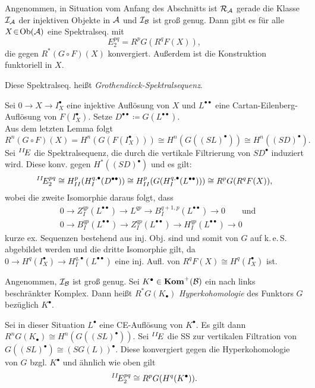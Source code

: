 \documentclass{cheat-sheet}
\newcommand{\CC}[1]{{#1}_{\bullet}} %
\newcommand{\CCC}[1]{{#1}^{\bullet}} %
\newcommand{\DC}[1]{{#1}^{\bullet \bullet}} %
\newcommand{\keS}{k.\,e.\,S.} %
\newcommand{\Inj}{\mathcal{I}} %
\newcommand{\Ada}{\mathcal{R}} %
\begin{document}

\begin{thm}
  Angenommen, in Situation vom Anfang des Abschnitts ist $\Ada_\Aat$ gerade die Klasse $\Inj_\Aat$ der injektiven Objekte in $\mathcal{A}$ und $\mathcal{I}_{\mathcal{B}}$ ist groß genug.
  Dann gibt es für alle $X \!\in\! \operatorname{Ob}(\mathcal{A})$ eine Spektralseq. mit
  \[ E^{pq}_2 = R^p G(R^q F(X)), \]
  die gegen $R^*(G \circ F)(X)$ konvergiert.
  Außerdem ist die Konstruktion funktoriell in $X$.
\end{thm}

\begin{defn}
  Diese Spektralseq. heißt \emph{Grothendieck-Spektralsequenz}.
\end{defn}

\begin{beweis}
  Sei $0 \to X \to \CCC{I}_X$ eine injektive Auflösung von $X$ und $\DC{L}$ eine Cartan-Eilenberg-Auflösung von $F(\CCC{I}_X)$.
  Setze $\DC{D} \coloneqq G(\DC{L})$. \\
  Aus dem letzten Lemma folgt
  \[ R^n (G \circ F)(X) = H^n(G(F(\CCC{I}_X))) \cong H^n(G(\CCC{(SL)})) \cong H^n(\CCC{(SD)}). \]
  Sei $\prescript{II}{}\!E$ die Spektralsequenz, die durch die vertikale Filtrierung von $\CCC{SD}$ induziert wird. Diese konv. gegen $H^*(\CCC{(SD)})$ und es gilt:
  \[ \prescript{II}{}\!E^{pq}_2 \cong H_{II}^{p}(H_I^{q,\bullet}(\DC{D})) \cong H_{II}^p(G(H_I^{q,\bullet}(\DC{L}))) \cong R^p G(R^q F(X)), \]
  wobei die zweite Isomorphie daraus folgt, dass
  \begin{align*}
    & 0 \to Z^{qp}_I(\DC{L}) \to L^{qp} \to B^{q+1,p}_I(\DC{L}) \to 0
    \qquad \text{und} \\
    & 0 \to B^{qp}_I(\DC{L}) \to Z^{qp}_I(\DC{L}) \to H^{qp}_I(\DC{L}) \to 0
  \end{align*}
  kurze ex. Sequenzen bestehend aus inj. Obj. sind und somit von $G$ auf \keS{} abgebildet werden und die dritte Isomorphie gilt, da $0 \to H^q(\CCC{I}_X) \to H^{q,\bullet}_I(\DC{L})$ eine inj. Aufl. von $R^q F(X) \cong H^q(\CCC{I}_X)$ ist.
\end{beweis}

\begin{defn}
  Angenommen, $\Inj_\Bat$ ist groß genug.
  Sei $\CCC{K} \in \Kom^+(\Bat)$ ein nach links beschränkter Komplex.
  Dann heißt $R^* G(\CC{K})$ \emph{Hyperkohomologie} des Funktors $G$ bezüglich $\CCC{K}$.
\end{defn}

\begin{bem}
  Sei in dieser Situation $\CCC{L}$ eine CE-Auflösung von $\CCC{K}$.
  Es gilt dann $R^n G(\CC{K}) \cong H^n (G(\CCC{(SL)}))$.
  Sei $\prescript{II}{}\!E$ die SS zur vertikalen Filtration von $G(\CCC{(SL)}) \cong \CCC{(S G(L))}$. Diese konvergiert gegen die Hyperkohomologie von $G$ bzgl. $\CCC{K}$ und ähnlich wie oben gilt
  \[ \prescript{II}{}\!E^{pq}_2 \cong R^p G(H^q (\CCC{K})). \]
\end{bem}

\end{document}
